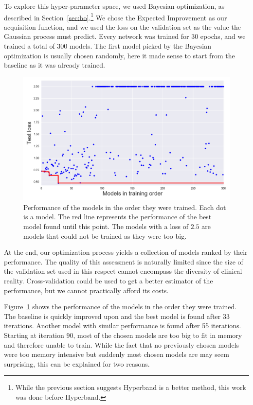 To explore this hyper-parameter space, we used Bayesian optimization, as described in Section~\ref{sec:bo}.\footnote{While the previous section suggests Hyperband is a better method, this work was done before Hyperband.} We chose the Expected Improvement as our acquisition function, and we used the loss on the validation set as the value the Gaussian process must predict. Every network was trained for 30 epochs, and we trained a total of 300 models. The first model picked by the Bayesian optimization is usually chosen randomly, here it made sense to start from the baseline as it was already trained.

\begin{figure}[htb]
	\centering
	\includegraphics[width=\linewidth]{img_hyperopt/mrfov_bo_ei}
	\caption{Performance of the models in the order they were trained. Each dot is a model. The red line represents the performance of the best model found until this point. The models with a loss of $2.5$ are models that could not be trained as they were too big.}
	\label{fig:mrfov_bo_ei}
\end{figure}

At the end, our optimization process yields a collection of models ranked by their performance. The quality of this assessment is naturally limited since the size of the validation set used in this respect cannot encompass the diversity of clinical reality. Cross-validation could be used to get a better estimator of the performance, but we cannot practically afford its costs. 

Figure~\ref{fig:mrfov_bo_ei} shows the performance of the models in the order they were trained. The baseline is quickly improved upon and the best model is found after 33 iterations. Another model with similar performance is found after 55 iterations. Starting at iteration 90, most of the chosen models are too big to fit in memory and therefore unable to train. While the fact that no previously chosen models were too memory intensive but suddenly most chosen models are may seem surprising, this can be explained for two reasons.


